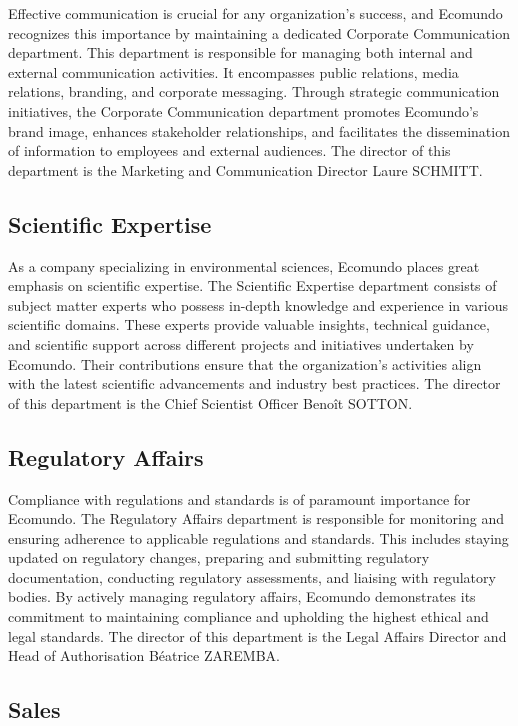 \documentclass[a4paper,12pt,twoside]{report}
\begin{document}
Effective communication is crucial for any organization's success, and Ecomundo recognizes this importance by maintaining a dedicated Corporate Communication department. This department is responsible for managing both internal and external communication activities. It encompasses public relations, media relations, branding, and corporate messaging. Through strategic communication initiatives, the Corporate Communication department promotes Ecomundo's brand image, enhances stakeholder relationships, and facilitates the dissemination of information to employees and external audiences. The director of this department is the Marketing and Communication Director Laure SCHMITT.

\subsection{Scientific Expertise}

As a company specializing in environmental sciences, Ecomundo places great emphasis on scientific expertise. The Scientific Expertise department consists of subject matter experts who possess in-depth knowledge and experience in various scientific domains. These experts provide valuable insights, technical guidance, and scientific support across different projects and initiatives undertaken by Ecomundo. Their contributions ensure that the organization's activities align with the latest scientific advancements and industry best practices. The director of this department is the Chief Scientist Officer Benoît SOTTON.

\subsection{Regulatory Affairs}

Compliance with regulations and standards is of paramount importance for Ecomundo. The Regulatory Affairs department is responsible for monitoring and ensuring adherence to applicable regulations and standards. This includes staying updated on regulatory changes, preparing and submitting regulatory documentation, conducting regulatory assessments, and liaising with regulatory bodies. By actively managing regulatory affairs, Ecomundo demonstrates its commitment to maintaining compliance and upholding the highest ethical and legal standards. The director of this department is the Legal Affairs Director and Head of Authorisation Béatrice ZAREMBA.

\subsection{Sales}
\end{document}
